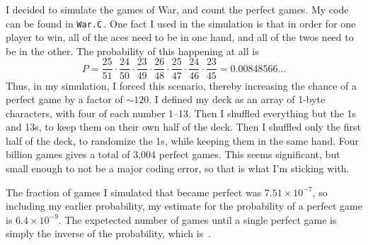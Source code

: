 \documentclass{article}
\begin{document}
I decided to simulate the games of War, and count the perfect games.
My code can be found in \texttt{War.C}\,.
One fact I used in the simulation is that in order for one player to win, all of the aces need to be in one hand, and all of the twos need to be in the other.
The probability of this happening at all is
\[
P=\frac{25}{51}\cdot\frac{24}{50}\cdot\frac{23}{49}\cdot\frac{26}{48}\cdot\frac{25}{47}\cdot\frac{24}{46}\cdot\frac{23}{45} =0.00848566\dots
\]
Thus, in my simulation, I forced this scenario, thereby increasing the chance of a perfect  game by a factor of $\sim\!120$.
I defined my deck as an array of 1-byte characters, with four of each number 1--13.
Then I shuffled everything but the 1s and 13s, to keep them on their own half of the deck.
Then I shuffled only the first half of the deck, to randomize the 1s, while keeping them in the same hand.
Four billion games gives a total of 3,004 perfect games.
This seems significant, but small enough to not be a major coding error, so that is what I'm sticking with.

The fraction of games I simulated that became perfect was $7.51\times10^{-7}$, so including my earlier probability, my estimate for the probability of a perfect game is $6.4\times10^{-9}$.
The expetected number of games until a single perfect game is simply the inverse of the probability, which is
\,.
\end{document}
